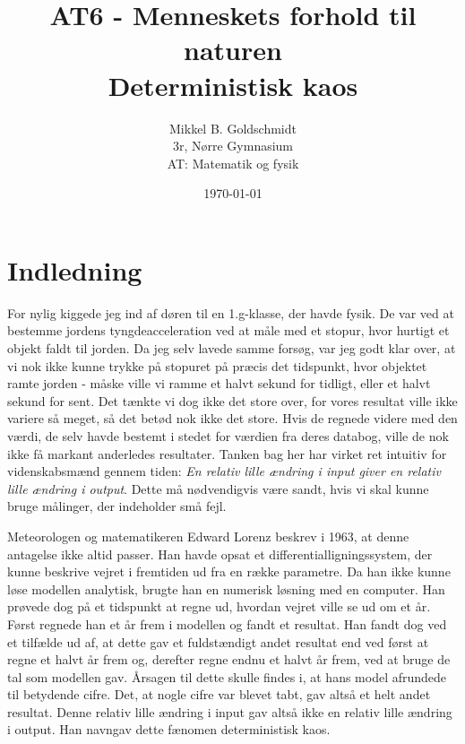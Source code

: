 \documentclass[10pt,a4paper]{article}
\author{Mikkel B. Goldschmidt\\ 3r, Nørre Gymnasium \\ AT: Matematik og fysik}
\title{AT6 - Menneskets forhold til naturen \\ Deterministisk kaos}
\date{\today}
\theoremstyle{break}
\theoremstyle{nonumberplain}
\begin{document}
\maketitle

\section{Indledning} For nylig kiggede jeg ind af døren til en 1.g-klasse, der havde fysik. 
De var ved at bestemme jordens tyngdeacceleration ved at måle med et stopur, hvor hurtigt et objekt faldt til jorden. 
Da jeg selv lavede samme forsøg, var jeg godt klar over, at vi nok ikke kunne trykke på stopuret på præcis det tidspunkt, hvor objektet ramte jorden - måske ville vi ramme et halvt sekund for tidligt, eller et halvt sekund for sent. 
Det tænkte vi dog ikke det store over, for vores resultat ville ikke variere så meget, så det betød nok ikke det store. 
Hvis de regnede videre med den værdi, de selv havde bestemt i stedet for værdien fra deres databog, ville de nok ikke få markant anderledes resultater. 
Tanken bag her har virket ret intuitiv for videnskabsmænd gennem tiden: 
\textit{En relativ lille ændring i input giver en relativ lille ændring i output}. 
Dette må nødvendigvis være sandt, hvis vi skal kunne bruge målinger, der indeholder små fejl.

Meteorologen og matematikeren Edward Lorenz beskrev i 1963, at denne antagelse ikke altid passer. 
Han havde opsat et differentialligningssystem, der kunne beskrive vejret i fremtiden ud fra en række parametre. 
Da han ikke kunne løse modellen analytisk, brugte han en numerisk løsning med en computer. 
Han prøvede dog på et tidspunkt at regne ud, hvordan vejret ville se ud om et år. 
Først regnede han et år frem i modellen og fandt et resultat. 
Han fandt dog ved et tilfælde ud af, at dette gav et fuldstændigt andet resultat end ved først at regne et halvt år frem og, derefter  regne endnu et halvt år frem, ved at bruge de tal som modellen gav. 
Årsagen til dette skulle findes i, at hans model afrundede til betydende cifre. 
Det, at nogle cifre var blevet tabt, gav altså et helt andet resultat. 
Denne relativ lille ændring i input gav altså ikke en relativ lille ændring i output. 
Han navngav dette fænomen deterministisk kaos.
\end{document}
